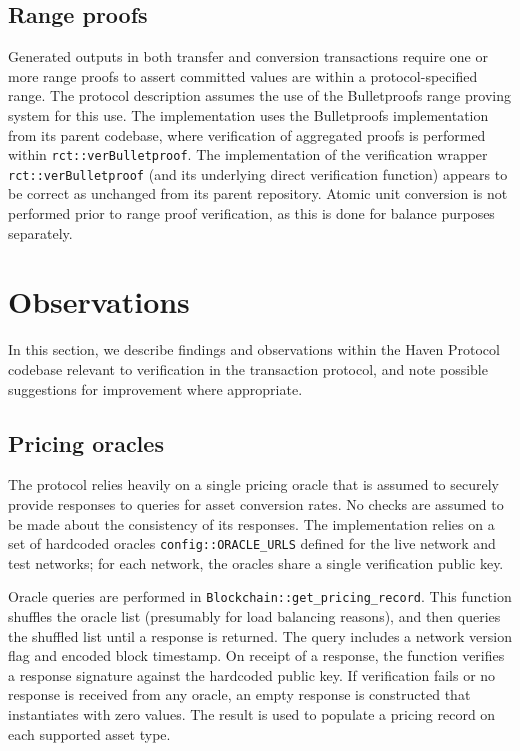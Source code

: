 \documentclass{article}
\begin{document}
\subsection{Range proofs}

Generated outputs in both transfer and conversion transactions require one or more range proofs to assert committed values are within a protocol-specified range.
The protocol description assumes the use of the Bulletproofs range proving system for this use.
The implementation uses the Bulletproofs implementation from its parent codebase, where verification of aggregated proofs is performed within \texttt{rct::verBulletproof}.
The implementation of the verification wrapper \texttt{rct::verBulletproof} (and its underlying direct verification function) appears to be correct as unchanged from its parent repository.
Atomic unit conversion is not performed prior to range proof verification, as this is done for balance purposes separately.


\section{Observations}

In this section, we describe findings and observations within the Haven Protocol codebase relevant to verification in the transaction protocol, and note possible suggestions for improvement where appropriate.


\subsection{Pricing oracles}

The protocol relies heavily on a single pricing oracle that is assumed to securely provide responses to queries for asset conversion rates.
No checks are assumed to be made about the consistency of its responses.
The implementation relies on a set of hardcoded oracles \texttt{config::ORACLE\_URLS} defined for the live network and test networks; for each network, the oracles share a single verification public key.

Oracle queries are performed in \texttt{Blockchain::get\_pricing\_record}.
This function shuffles the oracle list (presumably for load balancing reasons), and then queries the shuffled list until a response is returned.
The query includes a network version flag and encoded block timestamp.
On receipt of a response, the function verifies a response signature against the hardcoded public key.
If verification fails or no response is received from any oracle, an empty response is constructed that instantiates with zero values.
The result is used to populate a pricing record on each supported asset type.
\end{document}

